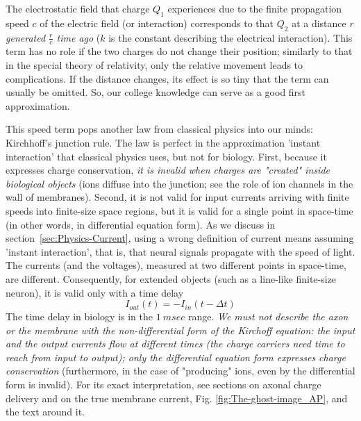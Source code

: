 The electrostatic field that charge $Q_1$ experiences
due to the finite propagation speed $c$ of the electric
field (or interaction) corresponds to that $Q_2$ at
a distance $r$ \textit{generated $\frac{r}{c}$ time ago}
($k$ is the constant describing the electrical interaction). This term
has no role if the two charges do not change their position; similarly
to that in the special theory of relativity, only the relative movement
leads to complications. If the distance changes, its effect is so
tiny that the term can usually be omitted. So, our college knowledge
can serve as a good first approximation.


This speed term pops another law from classical physics into our minds:
Kirchhoff's junction rule. The law is perfect in the approximation
'instant interaction' that classical
physics uses, but not for biology.
First, because it expresses charge conservation, \textit{it
is invalid when charges are "created" inside biological objects}
(ions diffuse into the junction; see the role of ion channels in the
wall of membranes). Second, it is not valid for input currents arriving
with finite speeds into finite-size space regions, but it is valid for a single point in space-time
(in other words, in differential equation form). 
As we discuss in section~\ref{sec:Physics-Current},
using a wrong definition of current means assuming 'instant interaction', that is, that neural signals propagate with the speed of light.
The currents (and
the voltages), measured at two different points in space-time, are
different. Consequently, for extended objects (such as a line-like finite-size
neuron), it is valid only with a time delay
%
\begin{equation}
I_{out}(t)=-I_{in}(t-\Delta t)\label{eq:Kirchoff_biology}
\end{equation}
%
The time delay in biology is in the $1\ msec$
range.
\textit{We must not describe the axon or the membrane with the non-differential form of the Kirchoff equation:
the input and the output currents flow at different times (the charge carriers need time to reach from input to output); only the differential
equation form expresses charge conservation} (furthermore, in the case of "producing" ions, even by the differential form is invalid).
For its exact interpretation, see sections on
{axonal charge delivery}
and on the
{true membrane current}, Fig. \ref{fig:The-ghost-image_AP},
and the text around it.

